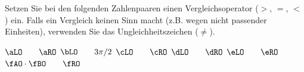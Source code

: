 Setzen Sie bei den folgenden Zahlenpaaren einen Vergleichsoperator ($>$, $=$, $<$) ein. Falls ein Vergleich keinen Sinn macht (z.B. wegen nicht passender Einheiten), verwenden Sie das Ungleichheitszeichen ($\neq$).

\begin{abcliste}
\abc $\aLO \qquad \aRO$
\abc $\bLO \qquad 3\pi/2$
\abc $\cLO \qquad \cRO$
\abc $\dLO \qquad \dRO$
\abc $\eLO \qquad \eRO$
\abc $\fAO\cdot\fBO \qquad \fRO$
\end{abcliste}
